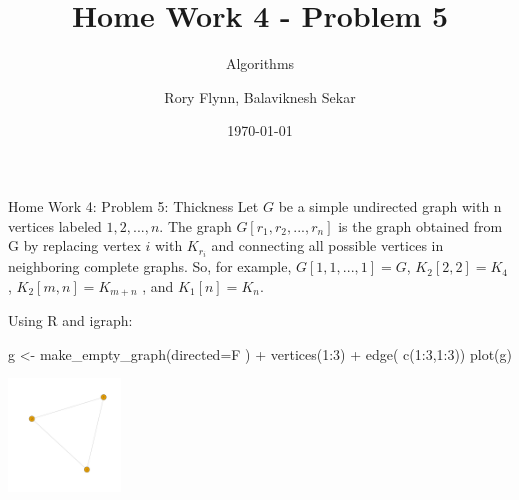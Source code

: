\documentclass[9pt]{beamer}\usepackage[]{graphicx}\usepackage[]{color}
\title{Home Work 4 - Problem 5}
\subtitle{Algorithms}
\author{Rory Flynn, Balaviknesh Sekar}
\institute{University of Colorado Denver}
\date{\today}
\begin{document}
\begin{frame}[plain]
\maketitle
\end{frame}





\begin{frame}[fragile]{Home Work 4: Problem 5: Thickness}
     Let $G$ be a simple undirected graph with n vertices labeled $1,2,. . .,n$. The graph $G[r_1 , r_2 , . . . , r_n ]$ is the graph obtained from G by replacing vertex $i$ with $K_{r_i}$ and connecting all possible vertices in neighboring complete graphs. So, for example, $G[1, 1, . . . , 1] = G$, $K_2 [2, 2] = K_4$ , $K_2 [m, n] = K_{m+n}$ , and $K_1 [n] = K_n$.
   
  Using R and igraph:
\begin{Schunk}
\begin{Sinput}
g <- make_empty_graph(directed=F ) +
  vertices(1:3) +
  edge( c(1:3,1:3))
  plot(g)
\end{Sinput}

\includegraphics[width=3cm]{figure/unnamed-chunk-1-1} \end{Schunk}
  
\end{frame}
\end{document}
